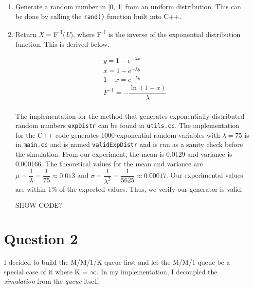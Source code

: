 \documentclass{article}
\begin{document}
\begin{enumerate}
    \item Generate a random number in [0, 1] from an uniform distribution. This can be done by calling the \texttt{rand()} function
          built into C++.
    \item Return \textit{X} = F\textsuperscript{-1}(\textit{U}), where F\textsuperscript{-1} is the inverse of the exponential distribution function. This is derived below.

        \begin{align*}
            &y = 1 - e^{-\lambda x} \\
            &x = 1 - e^{-\lambda y} \\
            &1 - x = e^{-\lambda y} \\
            &F^{-1} = -\dfrac{\ln (1 - x)}{\lambda} \\
        \end{align*}

        The implementation for the method that generates exponentially distributed random numbers \texttt{expDistr} can be found in \texttt{utils.cc}.
        \newline \newline
        The implementation for the C++ code generates 1000 exponential random variables with $\lambda = 75$ is in \texttt{main.cc} and is named
        \texttt{validExpDistr} and is run as a sanity check before the simulation. From our experiment, the mean is 0.0129 and variance is 0.000166.
        The theoretical values for the mean and variance are $\mu = \dfrac{1}{\lambda} = \dfrac{1}{75} \approx 0.013$ and
        $\sigma = \dfrac{1}{\lambda^2} = \dfrac{1}{5625} \approx 0.00017$.
        Our experimental values are within 1\% of the expected values. Thus, we verify our generator is valid.

SHOW CODE?
\end{enumerate}



\section{Question 2}

I decided to build the M/M/1/K queue first and let the M/M/1 queue be a special case of it where K = $\infty$.
In my implementation, I decoupled the \textit{simulation} from the \textit{queue} itself.
\end{document}
